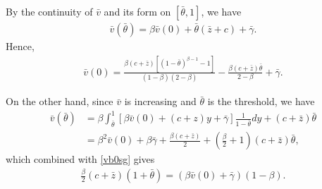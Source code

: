 \documentclass[graybox]{svmult}
\begin{document}
By the continuity of $\bar v$ and its form on $[\bar \theta, 1]$, we have \begin{align}\label{vb0sg}
\bar v(\bar \theta)= \beta \bar v(0)+\bar\theta(\bar  z+c) +\bar \gamma. \end{align}
Hence,
\begin{align}
[(1-\bar \theta)^{\beta-1}-\beta ]\bar v(0)=\frac{ \beta (c+\bar z)
[(1-\bar \theta)^{\beta-1}-1]}{(1-\beta)(2-\beta)} -\frac{\beta  (c+\bar z)\bar\theta}{2-\beta}
+\bar\gamma.\label{univ0}
\end{align}

On the other hand, since $\bar v$ is increasing and $\bar \theta$ is the threshold, we have
\begin{align*}
\bar v(\bar\theta)& = \beta\int_{\bar \theta}^1 [\beta \bar v(0) +(c+z) y +\bar\gamma] \frac{1}{1-\bar \theta} dy  +(c+\bar z)\bar \theta\\
&= \beta^2 \bar v(0) +\beta \bar\gamma
+\frac{\beta(c+\bar z)}{2} +(\frac{\beta }{2} +1) (c+\bar z)\bar\theta,
\end{align*}
which combined with \eqref{vb0sg} gives
\begin{align}
\frac{\beta}{2} (c+\bar z)(1+\bar \theta)= (\beta
\bar v(0) +\bar\gamma) (1-\beta). \label{unith}
\end{align}
\end{document}
